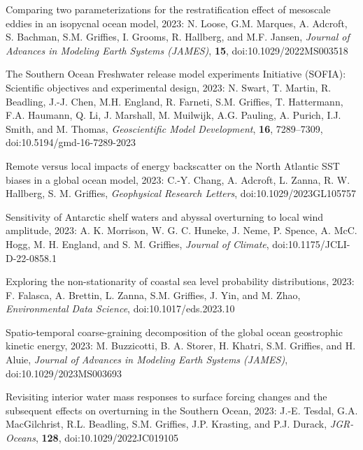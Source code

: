 \begin{etaremune}
\item Comparing two parameterizations for the restratification effect of mesoscale eddies in an isopycnal ocean model, 2023: N. Loose, G.M. Marques, A. Adcroft, S. Bachman, S.M. Grif\/f\/ies, I. Grooms, R. Hallberg, and M.F. Jansen, {\it Journal of Advances in Modeling Earth Systems (JAMES)}, {\bf 15}, doi:10.1029/2022MS003518

\item The Southern Ocean Freshwater release model experiments Initiative (SOFIA): Scientific objectives and experimental design, 2023: N. Swart, T. Martin, R. Beadling, J.-J. Chen, M.H. England, R. Farneti, S.M. Grif\/f\/ies, T. Hattermann, F.A. Haumann, Q. Li, J. Marshall, M. Muilwijk, A.G. Pauling, A. Purich, I.J. Smith, and M. Thomas,  {\it Geoscientific Model Development}, {\bf 16}, 7289–7309, doi:10.5194/gmd-16-7289-2023





\item Remote versus local impacts of energy backscatter on the North Atlantic SST biases in a global ocean model, 2023: C.-Y. Chang,  A. Adcroft, L. Zanna, R. W. Hallberg, S. M. Grif\/f\/ies, {\it  Geophysical Research Letters}, doi:10.1029/2023GL105757

\item Sensitivity of Antarctic shelf waters and abyssal overturning to local wind amplitude, 2023: A. K. Morrison, W. G. C. Huneke, J. Neme, P. Spence, A. McC. Hogg, M. H. England, and S. M. Grif\/f\/ies, {\it Journal of Climate}, doi:10.1175/JCLI-D-22-0858.1

\item Exploring the non-stationarity of coastal sea level probability distributions, 2023: F. Falasca, A. Brettin, L. Zanna, S.M. Grif\/f\/ies, J. Yin, and M. Zhao, {\it Environmental Data Science}, doi:10.1017/eds.2023.10

\item Spatio-temporal coarse-graining decomposition of the global ocean geostrophic kinetic energy, 2023:  M. Buzzicotti, B. A. Storer, H. Khatri, S.M. Grif\/f\/ies, and H. Aluie, {\it Journal of Advances in Modeling Earth Systems (JAMES)},
doi:10.1029/2023MS003693

\item Revisiting interior water mass responses to surface forcing changes and the subsequent effects on overturning in the Southern Ocean, 2023: J.-E. Tesdal, G.A. MacGilchrist, R.L. Beadling, S.M. Grif\/f\/ies, J.P. Krasting, and P.J. Durack, {\it JGR-Oceans}, {\bf 128}, doi:10.1029/2022JC019105



\end{etaremune}
